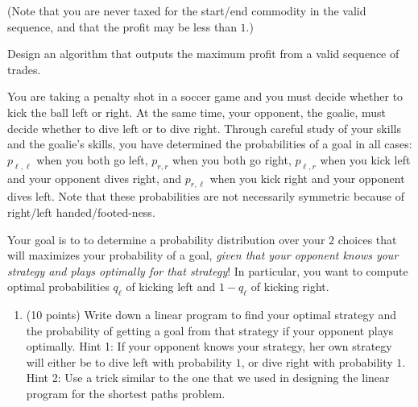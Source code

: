 \documentclass[11pt]{article}
\newcommand{\ans}[1]{ }
\begin{document}
\begin{enumerate}
\begin{enumerate}
(Note that you are never taxed for the start/end commodity in the valid sequence, and that the profit may be less than $1$.)

Design an algorithm that outputs the maximum profit from a valid sequence of trades.

\ans{Create a graph with a vertex for every commodity.  Let the weight of edge $u \rightarrow v$ equal $- \log R[u,v]$.  Let the weight of vertex $v$ equal $- \log (1-t_{v})$.  Now run modified Floyd Warshall with the recurrence in the previous problem to fill in all entries of the array.  Find the vertex $v$ that minimizes $dist(v,v,n)$; return $2^{-dist(v,v,n)}$}


\end{enumerate}




You are taking a penalty shot in a soccer game and you must decide whether to kick the ball left or right.  At the same time, your opponent, the goalie, must decide whether to dive left or to dive right.  Through careful study of your skills and the goalie's skills, you have determined the probabilities of a goal in all cases: $p_{\ell,\ell}$ when you both go left, $p_{r,r}$ when you both go right, $p_{\ell,r}$ when you kick left and your opponent dives right, and $p_{r,\ell}$ when you kick right and your opponent dives left.  Note that these probabilities are not necessarily symmetric because of right/left handed/footed-ness.

Your goal is to to determine a probability distribution over your $2$ choices that will maximizes your probability of a goal,  \emph{given that your opponent knows your strategy and plays optimally for that strategy}!  In particular, you want to compute optimal probabilities $q_{\ell}$ of kicking left and $1-q_{\ell}$ of kicking right.

\begin{enumerate}

\item (10 points) Write down a linear program to find your optimal strategy and the probability of getting a goal from that strategy if your opponent plays optimally.  Hint 1: If your opponent knows your strategy, her own strategy will either be to dive left with probability $1$, or dive right with probability $1$.   Hint 2: Use a trick similar to the one that we used in designing the linear program for the shortest paths problem.  
\ans{
Maximize w\\
Subject to:\\
$$ 0 \leq q_{\ell} \leq 1$$
$$ w \leq q_{\ell}p_{\ell,\ell} + (1-q_{\ell})p_{r,\ell}$$ %
$$ w \leq q_{\ell}p_{\ell,r} + (1-q_{\ell})p_{r,r}$$ %
}


\end{enumerate}
\end{enumerate}
\end{document}
